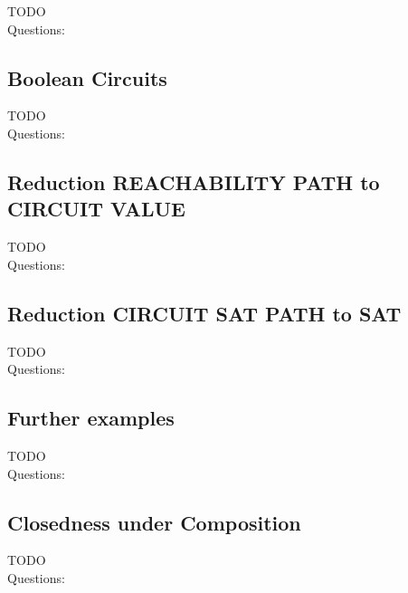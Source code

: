 \documentclass[a4]{scrartcl}
\begin{document}
\color{red} TODO \\
\color{black}
\color{violet} Questions:
\color{black}








\subsection*{Boolean Circuits}


\color{red} TODO \\
\color{black}
\color{violet} Questions:
\color{black}









\subsection*{Reduction REACHABILITY PATH to CIRCUIT VALUE}

\color{red} TODO \\
\color{black}
\color{violet} Questions:
\color{black}






\subsection*{Reduction CIRCUIT SAT PATH to SAT}

\color{red} TODO \\
\color{black}
\color{violet} Questions:
\color{black}









\subsection*{Further examples}

\color{red} TODO \\
\color{black}
\color{violet} Questions:
\color{black}








\subsection*{Closedness under Composition}


\color{red} TODO \\
\color{black}
\color{violet} Questions:
\color{black}





\newpage

\printbibliography
\end{document}
